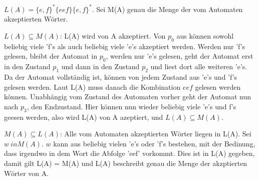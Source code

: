 \documentclass{article}
\begin{document}
\subsection{}
$L(A) =\{e,f\}^*\{eef\}\{e,f\}^*$. Sei M(A) genau die Menge der vom Automaten akzeptierten Wörter. 

$L(A) \subseteq M(A)$: L(A) wird von A akzeptiert. Von $ p_0$ aus können sowohl beliebig viele 'f's als auch beliebig viele 'e's akzeptiert werden.  
Werden nur 'f's gelesen, bleibt der Automat in $p_0$, werden nur 'e's gelesen, geht der Automat erst in den Zustand $p_1$ und 
dann in den Zustand $p_2$ und liest dort alle weiteren 'e's. Da der Automat vollständig ist, können von jedem Zustand aus 
'e's und 'f's gelesen werden. Laut L(A) muss danach die Kombination {$eef$} gelesen werden können. Unabhängig vom Zustand
 des Automaten vorher geht der Automat nun nach $p_3$, den Endzustand. Hier können nun wieder beliebig viele 'e's und f's geesen werden, also 
wird L(A) von A azeptiert, und $L(A) \subseteq M(A)$.   

$M(A) \subseteq L(A)$: Alle vom Automaten akzeptierten Wörter liegen in L(A). Sei $w \ in M(A)$. $w$ kann aus beliebig vielen
'e's oder 'f's bestehen, mit der Bedinung, dass irgendwo in dem Wort die Abfolge 'eef' vorkommt. Dies ist in L(A) gegeben,
 damit gilt L(A) = M(A) und L(A) beschreibt genau die Menge der akzptierten Wörter von A. 
\end{document}
